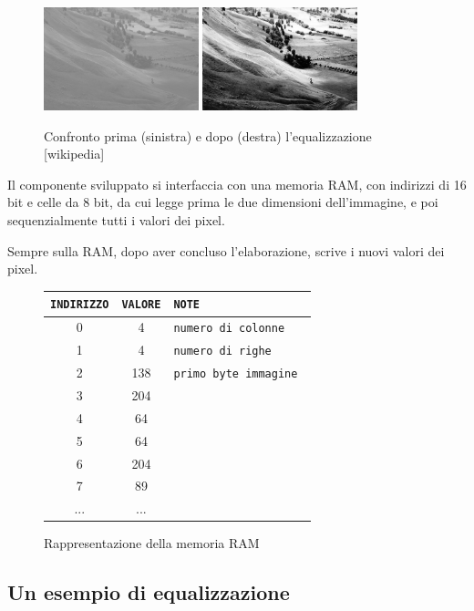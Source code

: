 \documentclass[11pt]{article}
\begin{document}
    \begin{figure}[h]
        \centering
        \includegraphics[width=0.4\textwidth]{before-eq.jpg}
        \qquad
        \includegraphics[width=0.4\textwidth]{after-eq.jpg}
        \caption{Confronto prima (sinistra) e dopo (destra) l'equalizzazione [wikipedia]}
    \end{figure}
    
	Il componente sviluppato si interfaccia con una memoria RAM, con indirizzi di 16 bit e celle da 8 bit, da cui legge prima le due dimensioni dell'immagine, e poi sequenzialmente tutti i valori dei pixel.

	Sempre sulla RAM, dopo aver concluso l'elaborazione, scrive i nuovi valori dei pixel. 

\renewcommand{\arraystretch}{1.2}
\begin{figure}[h]
    \centering
    \begin{tabular}{|c|c|l|}
    \hline
		\texttt{INDIRIZZO} & \texttt{VALORE} & \tt NOTE \\
            	\hline
		0 & 4 & \tt numero di colonne \\
		1 & 4 & \tt numero di righe \\
		2 & 138 & \tt primo byte immagine \\
		3 & 204 & \\
		4 & 64 &\\
		5 & 64 &\\
		6 & 204 &\\
		7 & 89 &\\
		... & ... & \\
		\hline
	\end{tabular}
    \caption{Rappresentazione della memoria RAM}
\end{figure}
\newpage
\subsection{Un esempio di equalizzazione}
    
\end{document}
